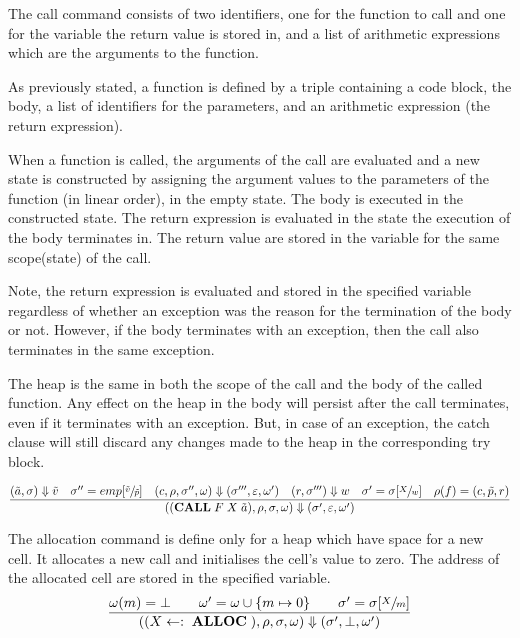 The call command consists of two identifiers, one for the function to call and one for the variable the return value is stored in, and a list of arithmetic expressions which are the arguments to the function.

As previously stated, a function is defined by a triple containing a code block, the body, a list of identifiers for the parameters, and an arithmetic expression (the return expression).

When a function is called, the arguments of the call are evaluated and a new state is constructed by assigning the argument values to the parameters of the function (in linear order), in the empty state. The body is executed in the constructed state. The return expression is evaluated in the state the execution of the body terminates in. The return value are stored in the variable for the same scope(state) of the call.

Note, the return expression is evaluated and stored in the specified variable regardless of whether an exception was the reason for the termination of the body or not. However, if the body terminates with an exception, then the call also terminates in the same exception.

The heap is the same in both the scope of the call and the body of the called function. Any effect on the heap in the body will persist after the call terminates, even if it terminates with an exception. But, in case of an exception, the catch clause will still discard any changes made to the heap in the corresponding try block.

\begin{equation}\label{eqn:op-call}
\frac
{(\tilde{a},\sigma) \Downarrow \tilde{v} \quad \sigma''= emp[\sfrac{\tilde{v}}{\tilde{p}}] \quad (c, \rho, \sigma'', \omega) \Downarrow (\sigma''', \varepsilon, \omega') \quad (r,\sigma''') \Downarrow w \quad \sigma' = \sigma[\sfrac{X}{w}] \quad \rho(f) = (c, \tilde{p}, r)}
{((\textbf{CALL}\; F \; X  \; \tilde{a}), \rho, \sigma, \omega) \Downarrow (\sigma', \varepsilon, \omega')}
\end{equation}

The allocation command is define only for a heap which have space for a new cell. It allocates a new call and initialises the cell's value to zero. The address of the allocated cell are stored in the specified variable.
\begin{equation}
\frac
{\omega(m)=\bot \qquad \omega'=\omega\cup\{m \mapsto 0\} \qquad \sigma' = \sigma[\sfrac{X}{m}]}
{((X\leftarrow:\;\textbf{ALLOC}\;), \rho, \sigma, \omega) \Downarrow (\sigma', \bot, \omega')}
\end{equation}


